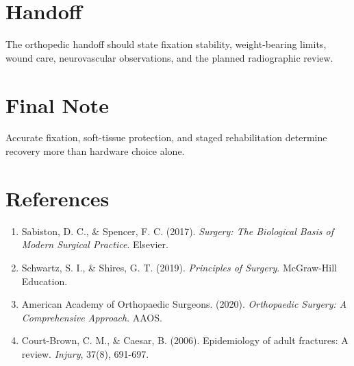 \section*{Handoff}
The orthopedic handoff should state fixation stability, weight-bearing limits, wound care, neurovascular observations, and the planned radiographic review.

\section*{Final Note}
Accurate fixation, soft-tissue protection, and staged rehabilitation determine recovery more than hardware choice alone.

\section*{References}

\begin{enumerate}
  \item Sabiston, D. C., \& Spencer, F. C. (2017). \textit{Surgery: The Biological Basis of Modern Surgical Practice}. Elsevier.
  
  \item Schwartz, S. I., \& Shires, G. T. (2019). \textit{Principles of Surgery}. McGraw-Hill Education.
  
  \item American Academy of Orthopaedic Surgeons. (2020). \textit{Orthopaedic Surgery: A Comprehensive Approach}. AAOS.
  
  \item Court-Brown, C. M., \& Caesar, B. (2006). Epidemiology of adult fractures: A review. \textit{Injury}, 37(8), 691-697.
\end{enumerate}

\clearpage
